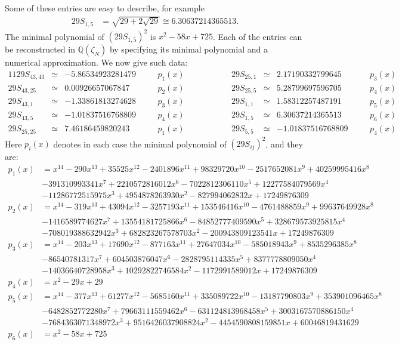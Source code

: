 \documentclass[12pt]{amsart}
\theoremstyle{plain}
\theoremstyle{definition}
\numberwithin{equation}{section}
\newcommand{\Q}{\mathbb{Q}}
\begin{document}
Some of these entries are easy to describe, for example
\begin{align*}
29 S_{1, 5} &= \sqrt{29 + 2\sqrt{29}} \cong 6.30637214365513.
\end{align*}
The minimal polynomial of $(29 S_{1,5})^2$ is $x^2 - 58x + 725$. Each of the entries can be reconstructed in $\Q(\zeta_N)$ by specifying its minimal polynomial and a numerical approximation. We now give such data:
\begin{alignat*}{11}
29 S_{43, 43} &\simeq& -5.86534923281479  &\quad& p_1(x)
&\qquad\qquad&
29 S_{25, 1}  &\simeq&  2.17190332799645  &\quad& p_3(x) \\
%
29 S_{43, 25} &\simeq&  0.00926657067847  &\quad& p_2(x)
&\qquad\qquad&
29 S_{25, 5}  &\simeq&  5.28799697596705  &\quad& p_4(x) \\
%
29 S_{43, 1}  &\simeq& -1.33861813274628  &\quad& p_3(x)
&\qquad\qquad&
29 S_{1, 1}   &\simeq&  1.58312257487191  &\quad& p_5(x) \\
%
29 S_{43, 5}  &\simeq& -1.01837516768809  &\quad& p_4(x)
&\qquad\qquad&
29 S_{1, 5}   &\simeq&  6.30637214365513  &\quad& p_6(x) \\
%
29 S_{25, 25} &\simeq&  7.46186459820243  &\quad& p_1(x)
&\qquad\qquad&
29 S_{5, 5}   &\simeq& -1.01837516768809  &\quad& p_4(x)
\end{alignat*}
Here $p_i(x)$ denotes in each case the minimal polynomial of $(29S_{ij})^2$, and they are:
{\footnotesize
\begin{align*}
p_1(x) &= x^{14} - 290x^{13} + 35525x^{12} - 2401896x^{11} + 98329720x^{10} - 2517652081x^9 + 40259995416x^8 \\
&- 391310993341x^7 + 2210572816012x^6 - 7022812306110x^5 + 12277584079569x^4 \\
&- 11286772515975x^3 + 4954878263930x^2 - 827994062832x + 17249876309 \\
p_2(x) &= x^{14} - 319x^{13} + 43094x^{12} - 3257193x^{11} + 153546416x^{10} - 4761488859x^9 + 99637649928x^8 \\
&- 1416589774627x^7 + 13554181725866x^6 - 84852777409590x^5 + 328679573925815x^4 \\
&- 708019388632942x^3 + 682823267578703x^2 - 200943809123541x + 17249876309 \\
p_3(x) &= x^{14} - 203x^{13} + 17690x^{12} - 877163x^{11} + 27647034x^{10} - 585018943x^9 + 8535296385x^8 \\
&- 86540781317x^7 + 604503876047x^6 - 2828795114335x^5 + 8377778809050x^4 \\
&- 14036640728958x^3 + 10292822746584x^2 - 1172991589012x + 17249876309 \\
p_4(x) &= x^2 - 29x + 29 \\
p_5(x) &= x^{14} - 377x^{13} + 61277x^{12} - 5685160x^{11} + 335089722x^{10} - 13187790803x^9 + 353901096465x^8 \\
&- 6482852772280x^7 + 79663111559462x^6 - 631124813968458x^5 + 3003167570886150x^4 \\
&- 7684363071348972x^3 + 9516426037908824x^2 - 4454590808159851x + 60046819431629 \\
p_6(x) &= x^2 - 58x + 725
\end{align*}
}
\end{document}
